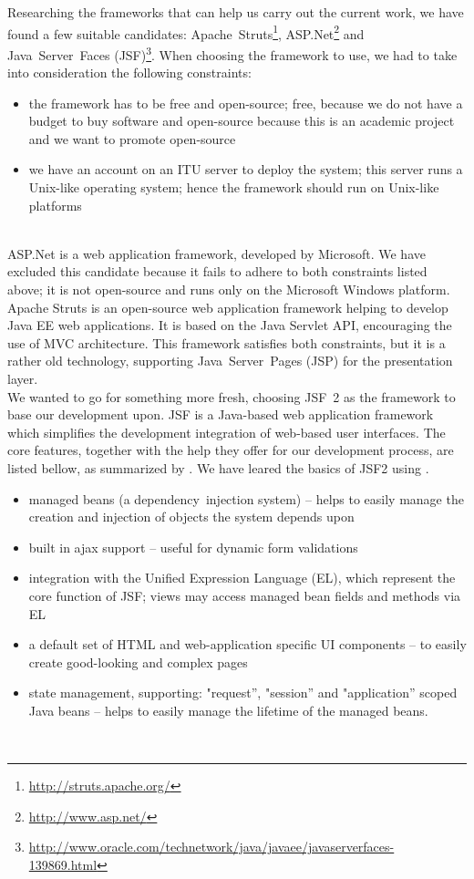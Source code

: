 \noindent Researching the frameworks that can help us carry out the current work, we have found a few suitable candidates: Apache~Struts\footnote{\url{http://struts.apache.org/}}, ASP.Net\footnote{\url{http://www.asp.net/}} and Java~Server~Faces (JSF)\footnote{\url{http://www.oracle.com/technetwork/java/javaee/javaserverfaces-139869.html}}. When choosing the framework to use, we had to take into consideration the following constraints:
\begin{itemize}
  \item the framework has to be free and open-source; free, because we do not
  have a budget to buy software and open-source because this is an academic
  project and we want to promote open-source
  \item we have an account on an ITU server to deploy the system; this
  server runs a Unix-like operating system; hence the framework should run on
  Unix-like platforms
\end{itemize}
\\

\noindent ASP.Net is a web application framework, developed by Microsoft. We have excluded this candidate because it fails to adhere to both constraints listed above; it is not open-source and runs only on the Microsoft Windows platform.
\\

\noindent Apache Struts is an open-source web application framework helping to develop Java EE web applications. It is based on the Java Servlet API, encouraging the use of MVC architecture. This framework satisfies both constraints, but it is a rather old technology, supporting Java~Server~Pages (JSP) for the presentation layer.
\\

\noindent We wanted to go for something more fresh, choosing JSF~2 as the framework to base our development upon. JSF is a Java-based web application framework which simplifies the development integration of web-based user interfaces. The core features, together with the help they offer for our development process, are listed bellow, as summarized by \cite{wiki}. We have leared the basics of JSF2 using \cite{Geary:3}.
\begin{itemize}
  \item managed beans (a dependency~injection system) -- helps to easily manage the creation and injection of objects the system depends upon
  \item built in ajax support -- useful for dynamic form validations
  \item integration with the Unified Expression Language (EL), which represent the core function of JSF; views may access managed bean fields and methods via EL
  \item a default set of HTML and web-application specific UI components -- to easily create good-looking and complex pages
  \item state management, supporting: "request'', "session'' and "application'' scoped Java beans -- helps to easily manage the lifetime of the managed beans.
\end{itemize}
\\

